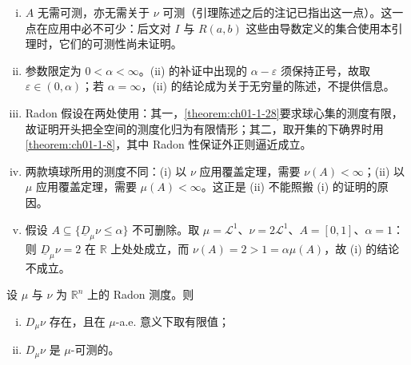 \documentclass[../../main.tex]{subfiles}%
\begin{document}
\begin{remark}\label{remark:ch01-lem-1-2-条件}
\begin{enumerate}[(i)]
\item $A$ 无需可测，亦无需关于 $\nu$ 可测（引理陈述之后的注记已指出这一点）。这一点在应用中必不可少：后文对 $I$ 与 $R(a,b)$ 这些由导数定义的集合使用本引理时，它们的可测性尚未证明。%
\item 参数限定为 $0<\alpha<\infty$。(ii) 的补证中出现的 $\alpha-\varepsilon$ 须保持正号，故取 $\varepsilon\in(0,\alpha)$；若 $\alpha=\infty$，(ii) 的结论成为关于无穷量的陈述，不提供信息。
\item Radon 假设在两处使用：其一，\cref{theorem:ch01-1-28}要求球心集的测度有限，故证明开头把全空间的测度化归为有限情形；其二，取开集的下确界时用\cref{theorem:ch01-1-8}，其中 Radon 性保证外正则逼近成立。%
\item 两款填球所用的测度不同：(i) 以 $\nu$ 应用覆盖定理，需要 $\nu(A)<\infty$；(ii) 以 $\mu$ 应用覆盖定理，需要 $\mu(A)<\infty$。这正是 (ii) 不能照搬 (i) 的证明的原因。
\item 假设 $A\subseteq\{\underline{D}_{\mu}\nu\leqslant\alpha\}$ 不可删除。取 $\mu=\mathcal{L}^1$、$\nu=2\mathcal{L}^1$、$A=[0,1]$、$\alpha=1$：则 $\underline{D}_{\mu}\nu=2$ 在 $\mathbb{R}$ 上处处成立，而 $\nu(A)=2>1=\alpha\mu(A)$，故 (i) 的结论不成立。
\end{enumerate}
\end{remark}

\begin{theorem}[测度的微分]\label{theorem:ch01-1-29}
设 $\mu$ 与 $\nu$ 为 $\mathbb{R}^n$ 上的 Radon 测度。则
\begin{enumerate}[(i)]
\item $D_{\mu}\nu$ 存在，且在 $\mu$-a.e. 意义下取有限值；
\item $D_{\mu}\nu$ 是 $\mu$-可测的。
\end{enumerate}
\end{theorem}
\end{document}
